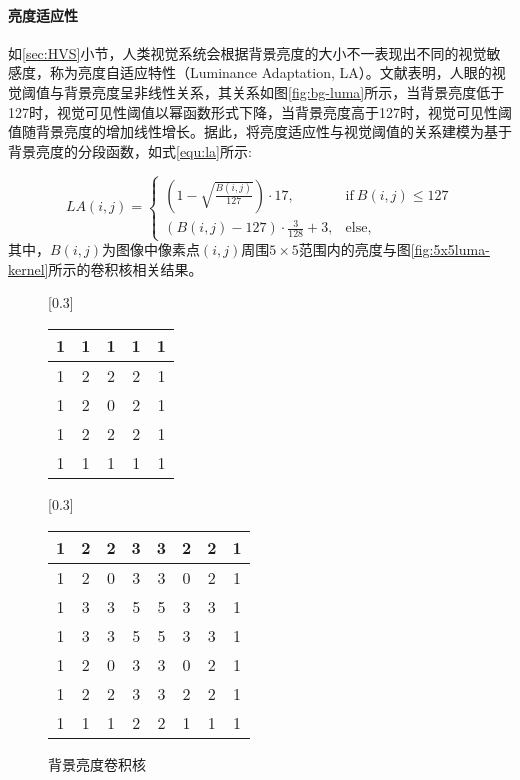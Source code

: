   \paragraph{亮度适应性} 如\ref{sec:HVS}小节，人类视觉系统会根据背景亮度的大小不一表现出不同的视觉敏感度，称为亮度自适应特性（Luminance Adaptation, LA）。文献\cite{chun-hsienchouPerceptuallyTunedSubband1995}表明，人眼的视觉阈值与背景亮度呈非线性关系，其关系如图\ref{fig:bg-luma}所示，当背景亮度低于127时，视觉可见性阈值以幂函数形式下降，当背景亮度高于127时，视觉可见性阈值随背景亮度的增加线性增长。据此，将亮度适应性与视觉阈值的关系建模为基于背景亮度的分段函数\cite{chun-hsienchouPerceptuallyTunedSubband1995}，如式\ref{equ:la}所示:

  \begin{equation} \label{equ:la}
    LA(i, j) = \begin{cases}
      \left(1 - \sqrt{\frac{B(i, j)}{127}}\right) \cdot 17, &\mathrm{if}\: B(i, j)\leq 127 \\
      \left(B(i, j) - 127\right) \cdot \frac{3}{128} + 3, &\mathrm{else},
    \end{cases}
  \end{equation}
  其中，$B(i, j)$为图像中像素点$(i, j)$周围$5\times 5$范围内的亮度与图\ref{fig:5x5luma-kernel}所示的卷积核相关结果。

  \begin{figure}
    \hspace{1cm}
		[0.3\textwidth]{
			\begin{tabular}{|c|c|c|c|c|}	\hline
				1 & 1 & 1 & 1 & 1 \\ \hline
				1 & 2 & 2 & 2 & 1 \\ \hline
				1 & 2 & 0 & 2 & 1 \\ \hline
				1 & 2 & 2 & 2 & 1 \\ \hline
				1 & 1 & 1 & 1 & 1 \\ \hline
			\end{tabular}
    }
    \hspace{2cm}
    [0.3\textwidth]{
			\begin{tabular}{|c|c|c|c|c|c|c|c|}	\hline
				1& 2& 2& 3& 3& 2& 2& 1 \\ \hline
				1& 2& 0& 3& 3& 0& 2& 1 \\ \hline
				1& 3& 3& 5& 5& 3& 3& 1 \\ \hline
				1& 3& 3& 5& 5& 3& 3& 1 \\ \hline
				1& 2& 0& 3& 3& 0& 2& 1 \\ \hline
				1& 2& 2& 3& 3& 2& 2& 1 \\ \hline
				1& 1& 1& 2& 2& 1& 1& 1 \\ \hline
			\end{tabular}
		}
    \caption{背景亮度卷积核}
	\end{figure}

